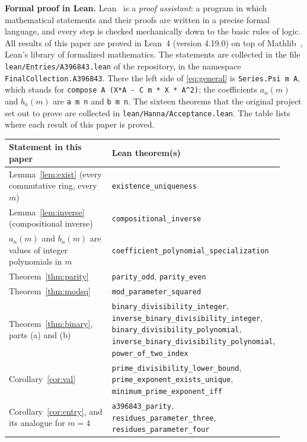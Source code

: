 \documentclass[11pt,a4paper]{article}
\theoremstyle{definition}
\theoremstyle{remark}
\newcommand{\para}[1]{\par\medskip\noindent\textbf{#1}\enspace}
\begin{document}
\para{Formal proof in Lean.}
Lean~\cite{lean} is a \emph{proof assistant}: a program in which mathematical statements and their proofs are written
in a precise formal language, and every step is checked mechanically down to the basic rules of logic. All results of
this paper are proved in Lean~4 (version 4.19.0) on top of Mathlib~\cite{mathlib}, Lean's library of formalized
mathematics. The statements are collected in the file \texttt{lean/Entries/A396843.lean} of the repository,
in the namespace \texttt{FinalCollection.A396843}. There the left side of \eqref{eq:general} is \texttt{Series.Psi m A}, which stands for
\texttt{compose A (X*A - C m * X * A\^{}2)}; the coefficients $a_n(m)$ and $b_n(m)$ are \texttt{a m n} and
\texttt{b m n}. The sixteen theorems that the original project set out to prove are collected in
\texttt{lean/Hanna/Acceptance.lean}.
The table lists where each result of this paper is proved.
\begin{center}\small\renewcommand{\arraystretch}{1.25}
\begin{tabular}{>{\raggedright\arraybackslash}p{0.52\linewidth}>{\raggedright\arraybackslash}p{0.4\linewidth}}
\toprule
Statement in this paper & Lean theorem(s)\\
\midrule
Lemma~\ref{lem:exist} (every commutative ring, every $m$) & \texttt{existence\_\allowbreak{}uniqueness} \\
Lemma~\ref{lem:inverse} (compositional inverse) & \texttt{compositional\_\allowbreak{}inverse} \\
$a_n(m)$ and $b_n(m)$ are values of integer polynomials in $m$ & \texttt{coefficient\_\allowbreak{}polynomial\_\allowbreak{}specialization} \\
Theorem~\ref{thm:parity} & \texttt{parity\_\allowbreak{}odd}, \texttt{parity\_\allowbreak{}even} \\
Theorem~\ref{thm:modsq} & \texttt{mod\_\allowbreak{}parameter\_\allowbreak{}squared} \\
Theorem~\ref{thm:binary}, parts (a) and (b) & \texttt{binary\_\allowbreak{}divisibility\_\allowbreak{}integer}, \texttt{inverse\_\allowbreak{}binary\_\allowbreak{}divisibility\_\allowbreak{}integer}, \texttt{binary\_\allowbreak{}divisibility\_\allowbreak{}polynomial}, \texttt{inverse\_\allowbreak{}binary\_\allowbreak{}divisibility\_\allowbreak{}polynomial}, \texttt{power\_\allowbreak{}of\_\allowbreak{}two\_\allowbreak{}index} \\
Corollary~\ref{cor:val} & \texttt{prime\_\allowbreak{}divisibility\_\allowbreak{}lower\_\allowbreak{}bound}, \texttt{prime\_\allowbreak{}exponent\_\allowbreak{}exists\_\allowbreak{}unique}, \texttt{minimum\_\allowbreak{}prime\_\allowbreak{}exponent\_\allowbreak{}iff} \\
Corollary~\ref{cor:entry}, and its analogue for $m=4$ & \texttt{a396843\_\allowbreak{}parity}, \texttt{residues\_\allowbreak{}parameter\_\allowbreak{}three}, \texttt{residues\_\allowbreak{}parameter\_\allowbreak{}four} \\
\bottomrule
\end{tabular}
\end{center}
\end{document}

